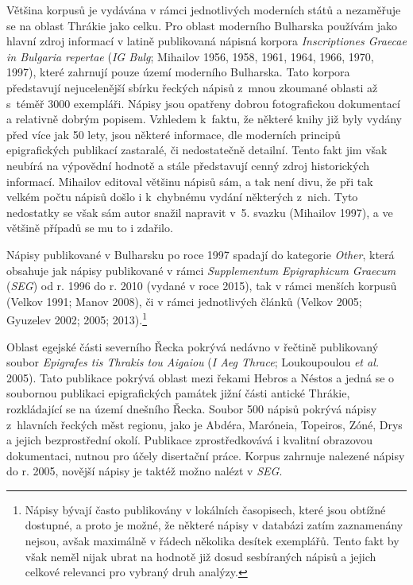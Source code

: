Většina korpusů je vydávána v rámci jednotlivých moderních států a nezaměřuje se na oblast Thrákie jako celku. Pro oblast moderního Bulharska používám jako hlavní zdroj informací v latině publikovaná nápisná korpora {\em Inscriptiones Graecae in Bulgaria repertae} ({\em IG Bulg}; Mihailov 1956, 1958, 1961, 1964, 1966, 1970, 1997), které zahrnují pouze území moderního Bulharska. Tato korpora představují nejucelenější sbírku řeckých nápisů z~mnou zkoumané oblasti až s~téměř 3000 exempláři. Nápisy jsou opatřeny dobrou fotografickou dokumentací a relativně dobrým popisem. Vzhledem k~faktu, že některé knihy již byly vydány před více jak 50 lety, jsou některé informace, dle moderních principů epigrafických publikací zastaralé, či nedostatečně detailní. Tento fakt jim však neubírá na výpovědní hodnotě a stále představují cenný zdroj historických informací. Mihailov editoval většinu nápisů sám, a tak není divu, že při tak velkém počtu nápisů došlo i k~chybnému vydání některých z~nich. Tyto nedostatky se však sám autor snažil napravit v~5. svazku (Mihailov 1997), a ve většině případů se mu to i zdařilo.

Nápisy publikované v Bulharsku po roce 1997 spadají do kategorie {\em Other}, která obsahuje jak nápisy publikované v rámci {\em Supplementum Epigraphicum Graecum} ({\em SEG}) od r. 1996 do r. 2010 (vydané v roce 2015), tak v rámci menších korpusů (Velkov 1991; Manov 2008), či v rámci jednotlivých článků (Velkov 2005; Gyuzelev 2002; 2005; 2013).\footnote{Nápisy bývají často publikovány v lokálních časopisech, které jsou obtížné dostupné, a proto je možné, že některé nápisy v databázi zatím zaznamenány nejsou, avšak maximálně v řádech několika desítek exemplářů. Tento fakt by však neměl nijak ubrat na hodnotě již dosud sesbíraných nápisů a jejich celkové relevanci pro vybraný druh analýzy.}

Oblast egejské části severního Řecka pokrývá nedávno v řečtině publikovaný soubor {\em Epigrafes tis Thrakis tou Aigaiou} ({\em I Aeg Thrace}; Loukoupoulou {\em et al.} 2005). Tato publikace pokrývá oblast mezi řekami Hebros a Néstos a jedná se o soubornou publikaci epigrafických památek jižní části antické Thrákie, rozkládající se na území dnešního Řecka. Soubor 500 nápisů pokrývá nápisy z~hlavních řeckých měst regionu, jako je Abdéra, Maróneia, Topeiros, Zóné, Drys a jejich bezprostřední okolí. Publikace zprostředkovává i kvalitní obrazovou dokumentaci, nutnou pro účely disertační práce. Korpus zahrnuje nalezené nápisy do r. 2005, novější nápisy je taktéž možno nalézt v {\em SEG}.

